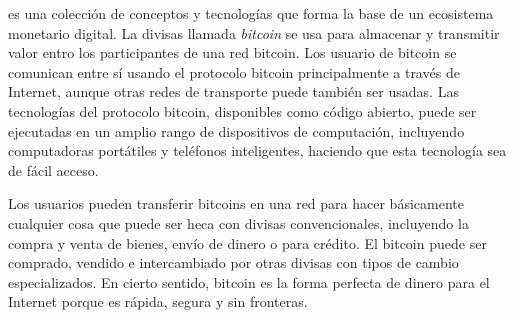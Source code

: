 \documentclass[10pt,journal,compsoc]{IEEEtran}
\begin{document}




% 
% 
% 
% 


 es una colección de conceptos y tecnologías que forma la base de un ecosistema monetario digital. La divisas llamada \emph{bitcoin} se usa para almacenar y transmitir valor entro los participantes de una red bitcoin. Los usuario de bitcoin se comunican entre sí usando el protocolo bitcoin principalmente a través de Internet, aunque otras redes de transporte puede también ser usadas. Las tecnologías del protocolo bitcoin, disponibles como código abierto, puede ser ejecutadas en un amplio rango de dispositivos de computación, incluyendo computadoras portátiles y teléfonos inteligentes, haciendo que esta tecnología sea de fácil acceso.

Los usuarios pueden transferir bitcoins en una red para hacer básicamente cualquier cosa que puede ser heca con divisas convencionales, incluyendo la compra y venta de bienes, envío de dinero o para crédito. El bitcoin puede ser comprado, vendido e intercambiado por otras divisas con tipos de cambio especializados. En cierto sentido, bitcoin es la forma perfecta de dinero para el Internet porque es rápida, segura y sin fronteras.
\end{document}
